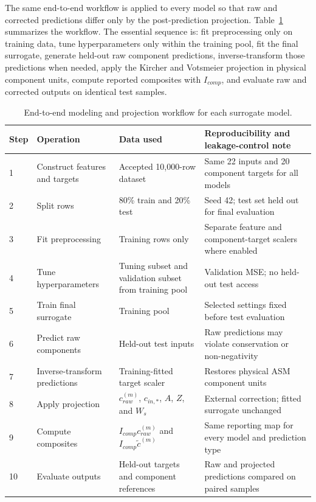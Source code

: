 \documentclass[a4paper,fleqn]{cas-sc}
\begin{document}
The same end-to-end workflow is applied to every model so that raw and corrected predictions differ only by the post-prediction projection. Table~\ref{tab:modeling_workflow} summarizes the workflow. The essential sequence is: fit preprocessing only on training data, tune hyperparameters only within the training pool, fit the final surrogate, generate held-out raw component predictions, inverse-transform those predictions when needed, apply the Kircher and Votsmeier projection in physical component units, compute reported composites with $I_{comp}$, and evaluate raw and corrected outputs on identical test samples.

\begin{table}[htbp]
\centering
\caption{End-to-end modeling and projection workflow for each surrogate model.}
\label{tab:modeling_workflow}
\scriptsize
\setlength{\tabcolsep}{3pt}
\begin{tabular}{p{0.7cm}p{3.3cm}p{3.0cm}p{4.2cm}}
\hline
Step & Operation & Data used & Reproducibility and leakage-control note \\
\hline
1 & Construct features and targets & Accepted 10,000-row dataset & Same 22 inputs and 20 component targets for all models \\
2 & Split rows & 80\% train and 20\% test & Seed 42; test set held out for final evaluation \\
3 & Fit preprocessing & Training rows only & Separate feature and component-target scalers where enabled \\
4 & Tune hyperparameters & Tuning subset and validation subset from training pool & Validation MSE; no held-out test access \\
5 & Train final surrogate & Training pool & Selected settings fixed before test evaluation \\
6 & Predict raw components & Held-out test inputs & Raw predictions may violate conservation or non-negativity \\
7 & Inverse-transform predictions & Training-fitted target scaler & Restores physical ASM component units \\
8 & Apply projection & $c_{raw}^{(m)}$, $c_{in,*}$, $A$, $Z$, and $W_s$ & External correction; fitted surrogate unchanged \\
9 & Compute composites & $I_{comp}c_{raw}^{(m)}$ and $I_{comp}\tilde{c}^{(m)}$ & Same reporting map for every model and prediction type \\
10 & Evaluate outputs & Held-out targets and component references & Raw and projected predictions compared on paired samples \\
\hline
\end{tabular}
\end{table}
\end{document}
